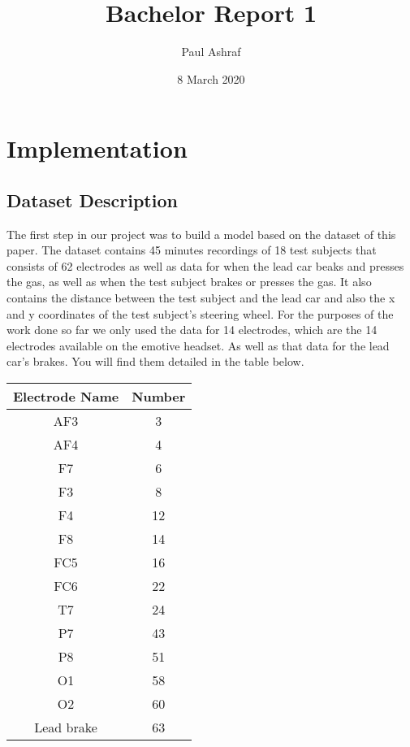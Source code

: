 \documentclass{article}
\title{Bachelor Report 1}
\author{Paul Ashraf }
\date{8 March 2020}
\begin{document}
\maketitle

\section{Implementation}
\subsection{Dataset Description}
 The first step in our project was to build a model based on the dataset of this paper. 
 \newline
 The dataset contains 45 minutes recordings of 18 test subjects that consists of 62 electrodes as well as data for when the lead car beaks and presses the gas, as well as when the test subject brakes or presses the gas. It also contains the distance between the test subject and the lead car and also the x and y coordinates of the test subject's steering wheel.
 \newline
 For the purposes of the work done so far we only used the data for 14 electrodes, which are the 14 electrodes available on the emotive headset. As well as that data for the lead car's brakes. You will find them detailed in the table below.
 \newline\newline
 
 
 \begin{center}
 \begin{tabular}{|c c|} 
 \hline
 Electrode Name & Number \\ 
 \hline\hline
 AF3 & 3 \\ 
 \hline
 AF4 & 4 \\
 \hline
 F7 & 6 \\
 \hline
 F3 & 8 \\
 \hline
 F4 & 12 \\
 \hline
 F8 & 14 \\
 \hline
 FC5 & 16 \\
 \hline
 FC6 & 22 \\
 \hline
 T7 & 24 \\
 \hline
 P7 & 43 \\
 \hline
 P8 & 51 \\
 \hline
  O1 & 58 \\
 \hline
  O2 & 60 \\
 \hline
 Lead brake & 63 \\
 \hline
\end{tabular}
\end{center}
\end{document}
